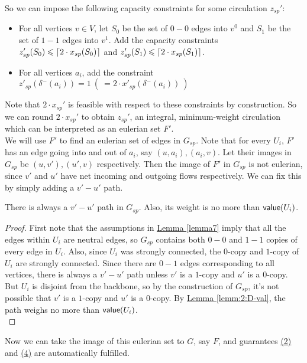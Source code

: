 \documentclass[./main.tex]{subfiles}
\DeclarePairedDelimiter\ceil{\lceil}{\rceil}
\begin{document}
		So we can impose the following capacity constraints for some circulation $z_{sp}'$:
		\begin{itemize}[-]
			\item For all vertices $v\in V$, let $S_0$ be the set of $0-0$ edges into $v^0$ and $S_1$ be the set of $1-1$ edges into $v^1$.
					Add the capacity constraints $z'_{sp}(S_0)\leqslant \ceil{2\cdot x_{sp}(S_0)}$ and $z'_{sp}(S_1)\leqslant \ceil{2\cdot x_{sp}(S_1)}$.

			\item For all vertices $a_i$, add the constraint $z'_{sp}(\delta^-(a_i)) = 1\  (\ = 2\cdot x'_{sp}(\delta^-(a_i))\ )$
		\end{itemize}
		Note that $2\cdot x_{sp}'$ is feasible with respect to these constraints by construction.
		So we can round $2\cdot x_{sp}'$ to obtain $z_{sp}'$, an integral, minimum-weight circulation which can be interpreted as an eulerian set $F'$.
		\vspace{2mm}\\
		We will use $F'$ to find an eulerian set of edges in $G_{sp}$. Note that for every $U_i$, $F'$ has an edge going into and out of $a_i$, say $(u,a_i),(a_i,v)$. Let their images in $G_{sp}$ be $(u,v'),(u',v)$ respectively. Then the image of $F'$ in $G_{sp}$ is not eulerian, since $v'$ and $u'$ have net incoming and outgoing flows respectively. We can fix this by simply adding a $v'-u'$ path.\\\vspace{2mm}

		\begin{claim}
			There is always a $v'-u'$ path in $G_{sp}$. Also, its weight is no more than $\textsf{\textup{value}}(U_i)$.\label{claim:7:uvpath}
		\end{claim}
		\begin{proof}
			First note that the assumptions in \hyperref[lemma7]{Lemma \ref{lemma7}} imply that all the edges within $U_i$ are neutral edges, so $G_{sp}$ contains both $0-0$ and $1-1$ copies of every edge in $U_i$. Also, since $U_i$ was strongly connected, the $0$-copy and $1$-copy of $U_i$ are strongly connected. Since there are $0-1$ edges corresponding to all vertices, there is always a $v'-u'$ path unless $v'$ is a $1$-copy and $u'$ is a $0$-copy. But $U_i$ is disjoint from the backbone, so by the construction of $G_{sp}$, it's not possible that $v'$ is a $1$-copy and $u'$ is a $0$-copy. By \hyperref[lemm:2:D-val]{Lemma \ref{lemm:2:D-val}}, the path weighs no more than $\textsf{\textup{value}}(U_i)$.\\
		\end{proof}
Now we can take the image of this eulerian set to $G$, say $F$, and guarantees \hyperref[lemm:main:2]{(2)} and \hyperref[lemm:main:4]{(4)} are automatically fulfilled.\vspace{2mm}
\end{document}
